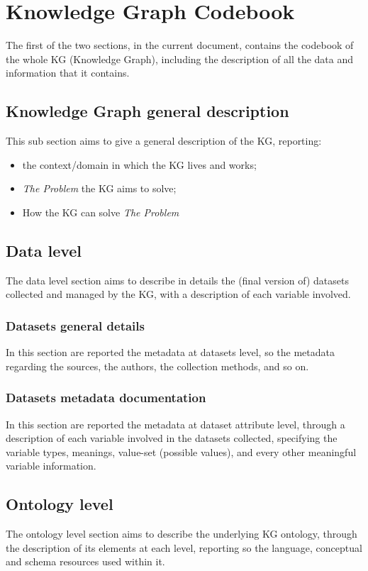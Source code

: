 \section{Knowledge Graph Codebook}
The first of the two sections, in the current document, contains the codebook of the whole KG (Knowledge Graph), including the description of all the data and information that it contains.

\subsection{Knowledge Graph general description}
This sub section aims to give a general description of the KG, reporting:
\begin{itemize}
  \item the context/domain in which the KG lives and works;
  \item \textit{The Problem} the KG aims to solve;
  \item How the KG can solve \textit{The Problem}
\end{itemize}

\subsection{Data level}
The data level section aims to describe in details the (final version of) datasets collected and managed by the KG, with a description of each variable involved.  

\subsubsection{Datasets general details}
In this section are reported the metadata at datasets level, so the metadata regarding the sources, the authors, the collection methods, and so on.

\subsubsection{Datasets metadata documentation}
In this section are reported the metadata at dataset attribute level, through a description of each variable involved in the datasets collected, specifying the variable types, meanings, value-set (possible values), and every other meaningful variable information. 

\subsection{Ontology level}
The ontology level section aims to describe the underlying KG ontology, through the description of its elements at each level, reporting so the language, conceptual and schema resources used within it. 

